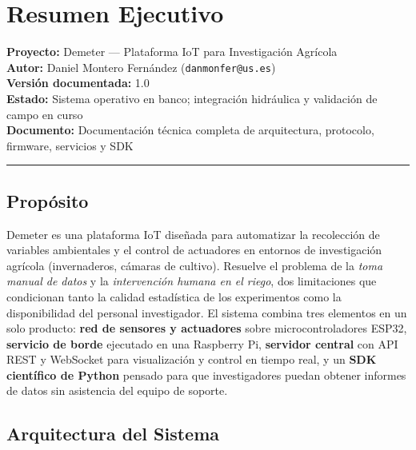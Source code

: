 \chapter*{Resumen Ejecutivo}

\noindent
\textbf{Proyecto:} Demeter --- Plataforma IoT para Investigación Agrícola \\
\textbf{Autor:} Daniel Montero Fernández (\texttt{danmonfer@us.es}) \\
\textbf{Versión documentada:} 1.0 \\
\textbf{Estado:} Sistema operativo en banco; integración hidráulica y validación
de campo en curso \\
\textbf{Documento:} Documentación técnica completa de arquitectura, protocolo,
firmware, servicios y SDK

\vspace{0.6em}
\noindent\rule{\textwidth}{0.4pt}

\section*{Propósito}

Demeter es una plataforma IoT diseñada para automatizar la recolección de variables
ambientales y el control de actuadores en entornos de investigación agrícola
(invernaderos, cámaras de cultivo). Resuelve el problema de la \textit{toma manual
de datos} y la \textit{intervención humana en el riego}, dos limitaciones que
condicionan tanto la calidad estadística de los experimentos como la disponibilidad
del personal investigador. El sistema combina tres elementos en un solo producto:
\textbf{red de sensores y actuadores} sobre microcontroladores ESP32, \textbf{servicio
de borde} ejecutado en una Raspberry Pi, \textbf{servidor central} con API REST y
WebSocket para visualización y control en tiempo real, y un \textbf{SDK científico de
Python} pensado para que investigadores puedan obtener informes de datos sin asistencia
del equipo de soporte.

\section*{Arquitectura del Sistema}

